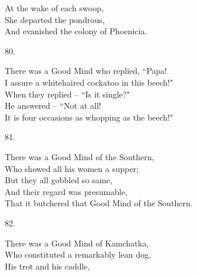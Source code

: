 \documentclass{book}
\begin{document}
{\hspace*{14mm}       At the wake of each swoop, \\
\hspace*{14mm}       She departed the pondrous, \\
\hspace*{14mm}       And evanished the colony of Phoenicia.
\begin{center}
    80.
\end{center}
\par
\noindent
\hspace*{14mm}       There was a Good Mind who replied, ``Papa! \\
\hspace*{14mm}       I assure a whitehaired cockatoo in this beech!" \\
\hspace*{14mm}       When they replied -- ``Is it single?" \\
\hspace*{14mm}       He answered -- ``Not at all! \\
\hspace*{14mm}       It is four occasions as whopping as the beech!"
\begin{center}
    81.
\end{center}
\par
\noindent
\hspace*{14mm}       There was a Good Mind of the Southern, \\
\hspace*{14mm}       Who showed all his women a supper; \\
\hspace*{14mm}       But they all gobbled so same, \\
\hspace*{14mm}       And their regard was presumable, \\
\hspace*{14mm}       That it butchered that Good Mind of the Southern.
\begin{center}
    82.
\end{center}
\par
\noindent
\hspace*{14mm}       There was a Good Mind of Kamchatka, \\
\hspace*{14mm}       Who constituted a remarkably lean dog, \\
\hspace*{14mm}       His trot and his caddle, \\
}
\end{document}

